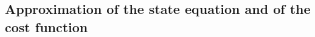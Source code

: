 \begin{figure}[H]
\caption{}\label{c6:fig5.2}
\end{figure}

\subsection{Approximation of the state equation and of the cost 
function}\label{c6:ss5.2}%

